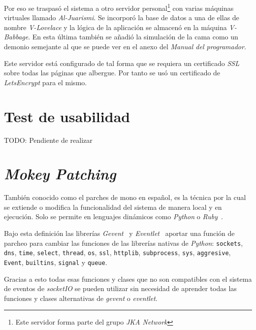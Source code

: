 Por eso se traspasó el sistema a otro servidor personal\footnote{Este servidor forma parte del grupo \textit{JKA Network}} con varias máquinas virtuales llamado \textit{Al-Juarismi}. Se incorporó la base de datos a una de ellas de nombre \textit{V-Lovelace} y la lógica de la aplicación se almacenó en la máquina \textit{V-Babbage}. En esta última también se añadió la simulación de la cama como un demonio semejante al que se puede ver en el anexo del \textit{Manual del programador}. %

Este servidor está configurado de tal forma que se requiera un certificado \textit{SSL} sobre todas las páginas que albergue. Por tanto se usó un certificado de \textit{LetsEncrypt} para el mismo.

\section{Test de usabilidad}

TODO: Pendiente de realizar

\section{\textit{Mokey Patching}}\label{cap:mokey}

También conocido como el parches de mono en español, es la técnica por la cual se extiende o modifica la funcionalidad del sistema de manera local y en ejecución. Solo se permite en lenguajes dinámicos como \textit{Python} o \textit{Ruby}~\cite{wiki:monkey_patch}.

Bajo esta definición las librerías \textit{Gevent}~\cite{tool:gevent} y \textit{Eventlet}~\cite{tool:eventlet} aportar una función de parcheo para cambiar las funciones de las librerías nativas de \textit{Python}: \texttt{sockets}, \texttt{dns}, \texttt{time}, \texttt{select}, \texttt{thread}, \texttt{os}, \texttt{ssl}, \texttt{httplib}, \texttt{subprocess}, \texttt{sys}, \texttt{aggresive}, \texttt{Event}, \texttt{builtins}, \texttt{signal} y \texttt{queue}.

Gracias a esto todas esas funciones y clases que no son compatibles con el sistema de eventos de \textit{socketIO} se pueden utilizar sin necesidad de aprender todas las funciones y clases alternativas de \textit{gevent} o \textit{eventlet}.

